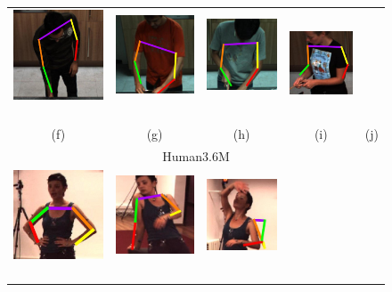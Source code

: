 \documentclass[runningheads]{llncs}
\begin{document}
\begin{figure}[t]
\begin{center}
\begin{tabular}{@{}c@{}c c@{}c@{}c@{}}
\includegraphics[width=0.17\linewidth]{figures/shots-cropped/mpii-s8f38-good-open-draw.jpg}\,&
\includegraphics[width=0.17\linewidth]{figures/shots-cropped/mpii-s2f10-bad-shoulders.jpg}\,&
\includegraphics[width=0.17\linewidth]{figures/shots-cropped/mpii-s5f52-bad-shoulders.jpg}\,&
\includegraphics[width=0.17\linewidth]{figures/shots-cropped/mpii-s14f21-bad-forearm.jpg}\\
(f) & (g) & (h) & (i) & (j)\\[0.6em]
\multicolumn{5}{c}{Human3.6M}\\
\includegraphics[width=0.17\linewidth]{figures/shots-cropped/h36m-s28f2-good-teapot.jpg}\,&
\includegraphics[width=0.17\linewidth]{figures/shots-cropped/h36m-s31f12-good-chair.jpg}\,&
\includegraphics[width=0.17\linewidth]{figures/shots-cropped/h36m-s7f8-bad-extreme-articulation.jpg}\,&

\end{tabular}
\end{center}
\end{figure}
\end{document}
